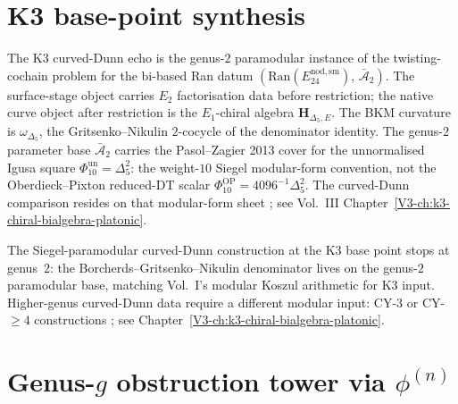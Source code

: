 \section{K3 base-point synthesis}
\label{sec:cdhg-supplement}

\begin{remark}
\label{rem:cdhg-1}
The K3 curved-Dunn echo is the genus-$2$ paramodular instance of
the twisting-cochain problem for the bi-based Ran datum
$(\mathrm{Ran}(E^{\mathrm{nod,sm}}_{24}),\,\bar{\mathcal A}_2)$.
The surface-stage object carries $E_2$ factorisation data before
restriction; the native curve object after restriction is the
$E_1$-chiral algebra $\mathbf H_{\Delta_5,E}$. The BKM curvature
is $\omega_{\Delta_5}$, the Gritsenko--Nikulin $2$-cocycle of the
denominator identity. The genus-$2$ parameter base
$\bar{\mathcal A}_2$ carries the Pasol--Zagier 2013 cover for the
unnormalised Igusa square $\Phi_{10}^{\mathrm{un}}=\Delta_5^2$:
the weight-$10$ Siegel modular-form convention, not the
Oberdieck--Pixton reduced-DT scalar
$\Phi_{10}^{\mathrm{OP}}=4096^{-1}\Delta_5^2$. The curved-Dunn
comparison resides on that modular-form sheet
\cite{GritsenkoNikulin1998,Borcherds1992,PasolZagier2013}; see
Vol.~III Chapter~\ref{V3-ch:k3-chiral-bialgebra-platonic}.
\end{remark}

\begin{remark}
\label{rem:cdhg-2}
The Siegel-paramodular curved-Dunn construction at the K3 base
point stops at genus~$2$: the Borcherds--Gritsenko--Nikulin
denominator lives on the genus-$2$ paramodular base, matching
Vol.~I's modular Koszul arithmetic for K3 input. Higher-genus
curved-Dunn data require a different modular input: CY-$3$ or
CY-$\geq4$ constructions
\cite{PiatetskiShapiroShafarevich1971,BailyBorel1966}; see
Chapter~\ref{V3-ch:k3-chiral-bialgebra-platonic}.
\end{remark}

\section{Genus-$g$ obstruction tower via $\phi^{(n)}$}
\label{sec:cdhg-supplement-ii}

